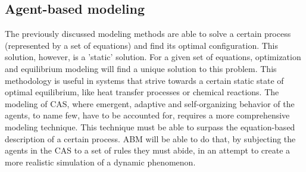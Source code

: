 \subsection{\large{Agent-based modeling}} \label{AgentBased}
The previously discussed modeling methods are able to solve a certain process (represented by a set of equations) and find its optimal configuration. This solution, however, is a 'static' solution. For a given set of equations, optimization and equilibrium modeling will find a unique solution to this problem. This methodology is useful in systems that strive towards a certain static state of optimal equilibrium, like heat transfer processes or chemical reactions. The modeling of CAS, where emergent, adaptive and self-organizing behavior of the agents, to name few, have to be accounted for, requires a more comprehensive modeling technique. This technique must be able to surpass the equation-based description of a certain process. ABM will be able to do that, by subjecting the agents in the CAS to a set of rules they must abide, in an attempt to create a more realistic simulation of a dynamic  phenomenon.
\newline \newline \noindent
